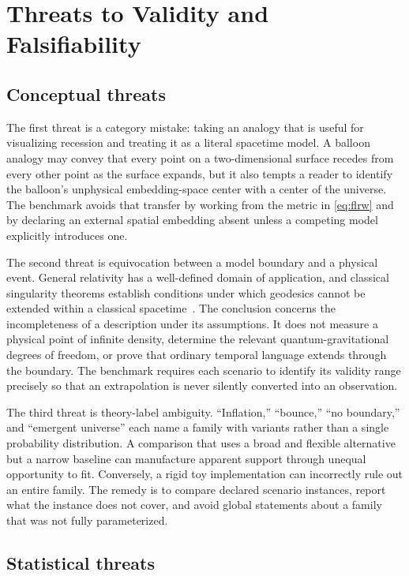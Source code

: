 \documentclass[10pt,conference]{IEEEtran}
\begin{document}
\section{Threats to Validity and Falsifiability}
\label{sec:validity}

\subsection{Conceptual threats}

The first threat is a category mistake: taking an analogy that is useful for visualizing recession and treating it as a literal spacetime model. A balloon analogy may convey that every point on a two-dimensional surface recedes from every other point as the surface expands, but it also tempts a reader to identify the balloon's unphysical embedding-space center with a center of the universe. The benchmark avoids that transfer by working from the metric in \eqref{eq:flrw} and by declaring an external spatial embedding absent unless a competing model explicitly introduces one.

The second threat is equivocation between a model boundary and a physical event. General relativity has a well-defined domain of application, and classical singularity theorems establish conditions under which geodesics cannot be extended within a classical spacetime~\cite{hawkingpenrose1970}. The conclusion concerns the incompleteness of a description under its assumptions. It does not measure a physical point of infinite density, determine the relevant quantum-gravitational degrees of freedom, or prove that ordinary temporal language extends through the boundary. The benchmark requires each scenario to identify its validity range precisely so that an extrapolation is never silently converted into an observation.

The third threat is theory-label ambiguity. ``Inflation,'' ``bounce,'' ``no boundary,'' and ``emergent universe'' each name a family with variants rather than a single probability distribution. A comparison that uses a broad and flexible alternative but a narrow baseline can manufacture apparent support through unequal opportunity to fit. Conversely, a rigid toy implementation can incorrectly rule out an entire family. The remedy is to compare declared scenario instances, report what the instance does not cover, and avoid global statements about a family that was not fully parameterized.

\subsection{Statistical threats}
\end{document}
